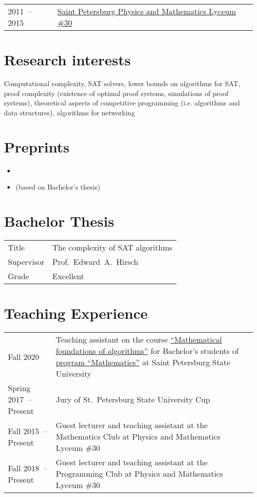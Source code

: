 \documentclass[a4paper, 11pt]{article}
\begin{document}
\begin{tabularx}{\textwidth}{lX}
    2011~-- 2015 & \href{http://www.school30.spb.ru/}{Saint Petersburg Physics and Mathematics Lyceum \#30}
\end{tabularx}


\section*{Research interests}

Computational complexity, SAT solvers, lower bounds on algorithms for SAT, proof complexity (existence of optimal proof systems, simulations of proof systems), theoretical aspects of competitive programming (i.e. algorithms and data structures), algorithms for networking

\section*{Preprints}

\begin{itemize}
    \item {}
    \item {} (based on Bachelor's thesis)
\end{itemize}

\section*{Bachelor Thesis}

\begin{tabularx}{\textwidth}{lX}
    Title & The complexity of SAT algorithms \\
    Supervisor & Prof.~Edward~A.~Hirsch \\
    Grade & Excellent
\end{tabularx}

\section*{Teaching Experience}

\begin{tabularx}{\textwidth}{lX}
    Fall 2020 & Teaching assistant on the course \href{https://users.math-cs.spbu.ru/~okhotin/teaching/algorithms_2020/}{``Mathematical foundations of algorithms''} for Bachelor's students of \href{https://math-cs.spbu.ru/en/}{program ``Mathematics''} at Saint Petersburg State University \\

    Spring 2017~-- Present & Jury of St.~Petersburg State University Cup \\

    Fall 2015~-- Present & Guest lecturer and teaching assistant at the Mathematics Club at Physics and Mathematics Lyceum \#30 \\
    
    Fall 2018~-- Present & Guest lecturer and teaching assistant at the Programming Club at Physics and Mathematics Lyceum \#30
\end{tabularx}
\end{document}
